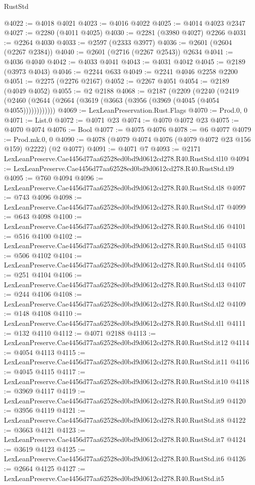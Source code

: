 \begin{lexlean}{RustStd}
\begin{coremodule}
@4022 := @4018 @4021
@4023 := @4016 @4022
@4025 := @4014 @4023 @2347
@4027 := @2280 (@4011 @4025)
@4030 := @2281 (@3980 @4027) @2266
@4031 := @2264 @4030
@4033 := @2597 (@2333 @3977)
@4036 := @2601 (@2604 (@2267 @2384))
@4040 := @2601 (@2716 (@2267 @2543)) @2634
@4041 := @4036 @4040
@4042 := @4033 @4041
@4043 := @4031 @4042
@4045 := @2189 (@3973 @4043)
@4046 := @2244 @633
@4049 := @2241 @4046 @2258 @2200
@4051 := @2275 (@2276 @2167)
@4052 := @2267 @4051
@4054 := @2189 (@4049 @4052)
@4055 := @2 @2188
@4068 := @2187
    (@2209
      (@2240 (@2419 (@2460 (@2644 (@2664 (@3619 (@3663 (@3956 (@3969 (@4045 (@4054 @4055))))))))))))
@4069 := LexLeanPreservation.Rust.Flags
@4070 := Prod.{0, 0}
@4071 := List.{0}
@4072 := @4071 @23
@4074 := @4070 @4072 @23
@4075 := @4070 @4074
@4076 := Bool
@4077 := @4075 @4076
@4078 := @6 @4077
@4079 := Prod.mk.{0, 0}
@4090 := @4078 (@4079 @4074 @4076 (@4079 @4072 @23 @156 @159) @2222) (@2 @4077)
@4091 := @4071 @7
@4093 := @2171 LexLeanPreserve.Cae4456d77aa62528ed0bd9d0612cd278.R40.RustStd.tl10
@4094 := LexLeanPreserve.Cae4456d77aa62528ed0bd9d0612cd278.R40.RustStd.tl9
@4095 := @760 @4094
@4096 := LexLeanPreserve.Cae4456d77aa62528ed0bd9d0612cd278.R40.RustStd.tl8
@4097 := @743 @4096
@4098 := LexLeanPreserve.Cae4456d77aa62528ed0bd9d0612cd278.R40.RustStd.tl7
@4099 := @643 @4098
@4100 := LexLeanPreserve.Cae4456d77aa62528ed0bd9d0612cd278.R40.RustStd.tl6
@4101 := @516 @4100
@4102 := LexLeanPreserve.Cae4456d77aa62528ed0bd9d0612cd278.R40.RustStd.tl5
@4103 := @506 @4102
@4104 := LexLeanPreserve.Cae4456d77aa62528ed0bd9d0612cd278.R40.RustStd.tl4
@4105 := @251 @4104
@4106 := LexLeanPreserve.Cae4456d77aa62528ed0bd9d0612cd278.R40.RustStd.tl3
@4107 := @244 @4106
@4108 := LexLeanPreserve.Cae4456d77aa62528ed0bd9d0612cd278.R40.RustStd.tl2
@4109 := @148 @4108
@4110 := LexLeanPreserve.Cae4456d77aa62528ed0bd9d0612cd278.R40.RustStd.tl1
@4111 := @132 @4110
@4112 := @4071 @2188
@4113 := LexLeanPreserve.Cae4456d77aa62528ed0bd9d0612cd278.R40.RustStd.it12
@4114 := @4054 @4113
@4115 := LexLeanPreserve.Cae4456d77aa62528ed0bd9d0612cd278.R40.RustStd.it11
@4116 := @4045 @4115
@4117 := LexLeanPreserve.Cae4456d77aa62528ed0bd9d0612cd278.R40.RustStd.it10
@4118 := @3969 @4117
@4119 := LexLeanPreserve.Cae4456d77aa62528ed0bd9d0612cd278.R40.RustStd.it9
@4120 := @3956 @4119
@4121 := LexLeanPreserve.Cae4456d77aa62528ed0bd9d0612cd278.R40.RustStd.it8
@4122 := @3663 @4121
@4123 := LexLeanPreserve.Cae4456d77aa62528ed0bd9d0612cd278.R40.RustStd.it7
@4124 := @3619 @4123
@4125 := LexLeanPreserve.Cae4456d77aa62528ed0bd9d0612cd278.R40.RustStd.it6
@4126 := @2664 @4125
@4127 := LexLeanPreserve.Cae4456d77aa62528ed0bd9d0612cd278.R40.RustStd.it5

\end{coremodule}
\end{lexlean}
